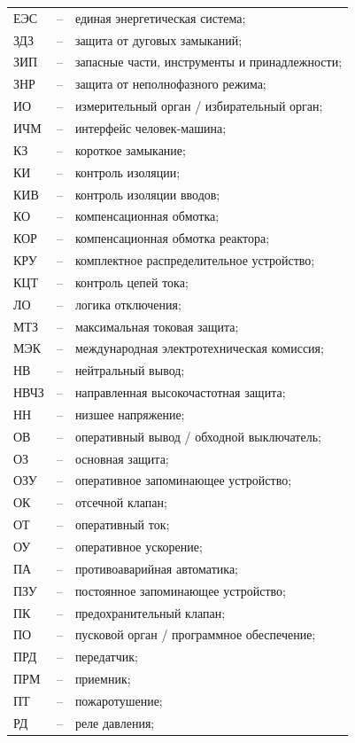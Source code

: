 \begin{longtable}{>{\raggedright\arraybackslash}m{2cm}>{\raggedright\arraybackslash}m{0.5cm}>{\raggedright\arraybackslash}m{20cm}}
ЕЭС & -- & единая энергетическая система; \\
ЗДЗ & -- & защита от дуговых замыканий; \\
ЗИП & -- & запасные части, инструменты и принадлежности; \\
ЗНР & -- & защита от неполнофазного режима; \\
ИО & -- & измерительный орган / избирательный орган; \\
ИЧМ & -- & интерфейс человек-машина; \\
КЗ & -- & короткое замыкание; \\
КИ & -- & контроль изоляции; \\
КИВ & -- & контроль изоляции вводов; \\
КО & -- & компенсационная обмотка; \\
КОР & -- & компенсационная обмотка реактора; \\
КРУ & -- & комплектное распределительное устройство; \\
КЦТ & -- & контроль цепей тока; \\
ЛО & -- & логика отключения; \\
МТЗ & -- & максимальная токовая защита; \\
МЭК & -- & международная электротехническая комиссия; \\
НВ & -- & нейтральный вывод; \\
НВЧЗ & -- & направленная высокочастотная защита; \\
НН & -- & низшее напряжение; \\
ОВ & -- & оперативный вывод / обходной выключатель; \\
ОЗ & -- & основная защита; \\
ОЗУ & -- & оперативное запоминающее устройство; \\
ОК & -- & отсечной клапан; \\
ОТ & -- & оперативный ток; \\
ОУ & -- & оперативное ускорение; \\
ПА & -- & противоаварийная автоматика; \\
ПЗУ & -- & постоянное запоминающее устройство; \\
ПК & -- & предохранительный клапан; \\
ПО & -- & пусковой орган / программное обеспечение; \\
ПРД & -- & передатчик; \\
ПРМ & -- & приемник; \\
ПТ & -- & пожаротушение; \\
РД & -- & реле давления; \\

\end{longtable}
